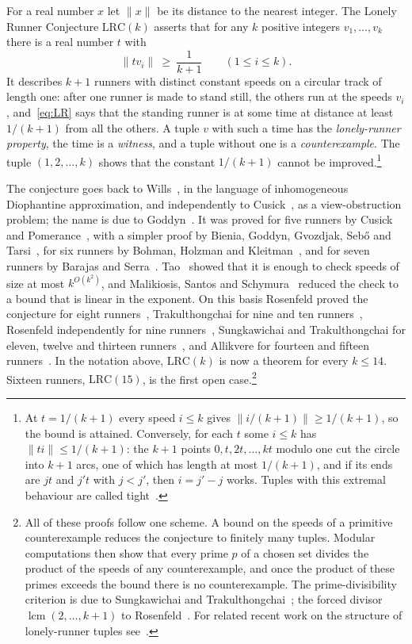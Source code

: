 \documentclass[11pt]{amsart}
\theoremstyle{definition}
\theoremstyle{remark}
\newcommand{\LRC}{\mathrm{LRC}}
\begin{document}
For a real number $x$ let $\|x\|$ be its distance to the nearest integer.
The Lonely Runner Conjecture $\LRC(k)$ asserts that for any $k$ positive
integers $v_1,\dots,v_k$ there is a real number $t$ with
\begin{equation}\label{eq:LR}
 \|t v_i\|\ \ge\ \frac1{k+1}\qquad(1\le i\le k).
\end{equation}
It describes $k+1$ runners with distinct constant speeds on a circular track
of length one: after one runner is made to stand still, the others run at
the speeds $v_i$, and~\eqref{eq:LR} says that the standing runner is at some
time at distance at least $1/(k+1)$ from all the others. A tuple $v$ with
such a time has the \emph{lonely-runner property}, the time is a
\emph{witness}, and a tuple without one is a \emph{counterexample}. The
tuple $(1,2,\dots,k)$ shows that the constant $1/(k+1)$ cannot be
improved.\footnote{At $t=1/(k+1)$ every speed $i\le k$ gives
$\|i/(k+1)\|\ge 1/(k+1)$, so the bound is attained. Conversely, for each
$t$ some $i\le k$ has $\|ti\|\le 1/(k+1)$: the $k+1$ points
$0,t,2t,\dots,kt$ modulo one cut the circle into $k+1$ arcs, one of which
has length at most $1/(k+1)$, and if its ends are $jt$ and $j't$ with
$j<j'$, then $i=j'-j$ works. Tuples with this extremal behaviour
are called tight~\cite{GW06}.}

The conjecture goes back to Wills~\cite{Wil67}, in the language of
inhomogeneous Diophantine approximation, and independently to
Cusick~\cite{Cus73}, as a view-obstruction problem; the name is due to
Goddyn~\cite{BGGST98}. It was proved for five runners by Cusick and
Pomerance~\cite{CP84}, with a simpler proof by Bienia, Goddyn, Gvozdjak,
Seb\H{o} and Tarsi~\cite{BGGST98}, for six runners by Bohman, Holzman and
Kleitman~\cite{BHK01}, and for seven runners by Barajas and
Serra~\cite{BS08}. Tao~\cite{Tao18} showed that it is enough to check
speeds of size at most $k^{O(k^2)}$, and Malikiosis, Santos and
Schymura~\cite{MSS25} reduced the check to a bound that is linear in the
exponent. On this basis Rosenfeld proved the conjecture for eight
runners~\cite{Ros26a}, Trakulthongchai for nine and ten
runners~\cite{Tra26}, Rosenfeld independently for nine
runners~\cite{Ros26b}, Sungkawichai and Trakulthongchai for eleven, twelve
and thirteen runners~\cite{ST26}, and Allikvere for fourteen and fifteen
runners~\cite{All26}. In the notation above, $\LRC(k)$ is now a theorem for
every $k\le 14$. Sixteen runners, $\LRC(15)$, is the first open
case.\footnote{All of these proofs follow one scheme. A bound on the speeds
of a primitive counterexample reduces the conjecture to finitely many
tuples. Modular computations then show that every prime $p$ of a chosen set
divides the product of the speeds of any counterexample, and once the
product of these primes exceeds the bound there is no counterexample. The
prime-divisibility criterion is due to Sungkawichai and
Trakulthongchai~\cite{ST26}; the forced divisor $\operatorname{lcm}(2,\dots,k+1)$
to Rosenfeld~\cite[Lemma~4]{Ros26a}. For related recent work on the
structure of lonely-runner tuples see~\cite{GK26,BCS26,PS24}.}
\end{document}
